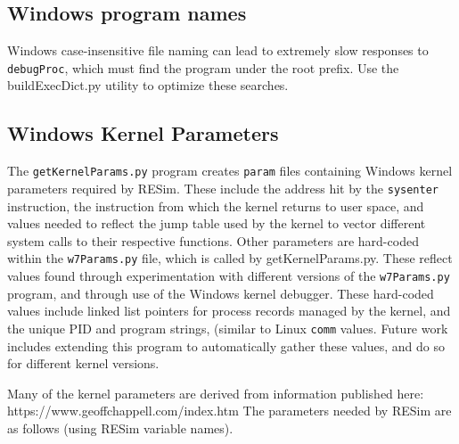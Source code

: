 \documentclass[titlepage]{article}
\begin{document}
\begin{appendices}
\subsection{Windows program names}
Windows case-insensitive file naming can lead to extremely slow responses to {\tt debugProc}, which must find the program under the root prefix.  Use the
buildExecDict.py utility to optimize these searches.

\subsection{Windows Kernel Parameters}
The {\tt getKernelParams.py} program creates {\tt param} files containing Windows kernel parameters required by RESim.  These include the address hit by the {\tt sysenter} instruction, 
the instruction from which the kernel returns to user space, and values needed to reflect the jump table used by the kernel to vector different system calls to their respective
functions.  Other parameters are hard-coded within the {\tt w7Params.py} file, which is called by getKernelParams.py.  These reflect values found through experimentation with different versions of the {\tt w7Params.py} program,
and through use of the Windows kernel debugger. These hard-coded values include linked list pointers for process records managed by the kernel, 
and the unique PID and program strings, (similar to Linux {\tt comm} values.  Future work includes extending this program to automatically gather these values, and do so for different 
kernel versions.

Many of the kernel parameters are derived from information published here:  https://www.geoffchappell.com/index.htm
The parameters needed by RESim are as follows (using RESim variable names).


\end{appendices}
\end{document}
